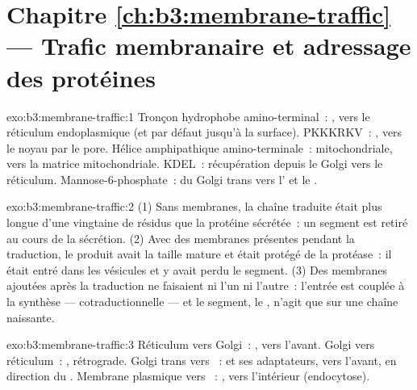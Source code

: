 \section*{Chapitre \ref{ch:b3:membrane-traffic} --- Trafic membranaire et adressage des protéines}

\begin{solution}{exo:b3:membrane-traffic:1}
Tronçon hydrophobe amino-terminal~: , vers le réticulum
endoplasmique (et par défaut jusqu'à la surface). PKKKRKV~: , vers le noyau par le pore. Hélice amphipathique
amino-terminale~:  mitochondriale, vers la matrice
mitochondriale. KDEL~: récupération depuis le Golgi vers le réticulum.
Mannose-6-phosphate~: du Golgi trans vers l' et le .
\end{solution}

\begin{solution}{exo:b3:membrane-traffic:2}
(1) Sans membranes, la chaîne traduite était plus longue d'une
vingtaine de résidus que la protéine sécrétée~: un segment est retiré
au cours de la sécrétion. (2) Avec des membranes présentes pendant la
traduction, le produit avait la taille mature et était protégé de la
protéase~: il était entré dans les vésicules et y avait perdu le
segment. (3) Des membranes ajoutées après la traduction ne faisaient ni
l'un ni l'autre~: l'entrée est couplée à la synthèse ---
cotraductionnelle --- et le segment, le , n'agit que sur
une chaîne naissante.
\end{solution}

\begin{solution}{exo:b3:membrane-traffic:3}
Réticulum vers Golgi~: , vers l'avant. Golgi vers réticulum~:
, rétrograde. Golgi trans vers ~:  et ses
adaptateurs, vers l'avant, en direction du . Membrane plasmique
vers ~: , vers l'intérieur (endocytose).
\end{solution}

